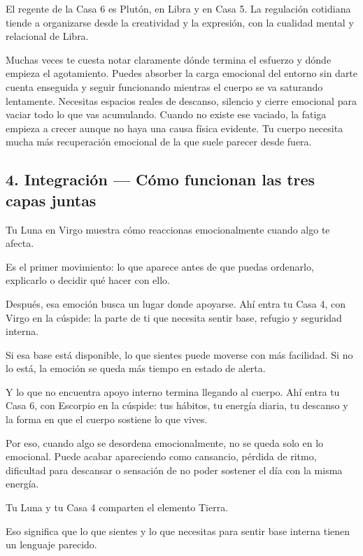 \documentclass[11pt,a4paper]{article}
\begin{document}
El regente de la Casa 6 es Plutón, en Libra y en Casa 5. La regulación cotidiana tiende a organizarse desde la creatividad y la expresión, con la cualidad mental y relacional de Libra.

Muchas veces te cuesta notar claramente dónde termina el esfuerzo y dónde empieza el agotamiento. Puedes absorber la carga emocional del entorno sin darte cuenta enseguida y seguir funcionando mientras el cuerpo se va saturando lentamente. Necesitas espacios reales de descanso, silencio y cierre emocional para vaciar todo lo que vas acumulando. Cuando no existe ese vaciado, la fatiga empieza a crecer aunque no haya una causa física evidente. Tu cuerpo necesita mucha más recuperación emocional de la que suele parecer desde fuera.

\vspace{0.8cm}

\subsection{4. Integración — Cómo funcionan las tres capas juntas}

Tu Luna en Virgo muestra cómo reaccionas emocionalmente cuando algo te afecta.

Es el primer movimiento: lo que aparece antes de que puedas ordenarlo, explicarlo o decidir qué hacer con ello.

Después, esa emoción busca un lugar donde apoyarse. Ahí entra tu Casa 4, con Virgo en la cúspide: la parte de ti que necesita sentir base, refugio y seguridad interna.

Si esa base está disponible, lo que sientes puede moverse con más facilidad.
Si no lo está, la emoción se queda más tiempo en estado de alerta.

Y lo que no encuentra apoyo interno termina llegando al cuerpo. Ahí entra tu Casa 6, con Escorpio en la cúspide: tus hábitos, tu energía diaria, tu descanso y la forma en que el cuerpo sostiene lo que vives.

Por eso, cuando algo se desordena emocionalmente, no se queda solo en lo emocional. Puede acabar apareciendo como cansancio, pérdida de ritmo, dificultad para descansar o sensación de no poder sostener el día con la misma energía.

Tu Luna y tu Casa 4 comparten el elemento Tierra.

Eso significa que lo que sientes y lo que necesitas para sentir base interna tienen un lenguaje parecido.
\end{document}
